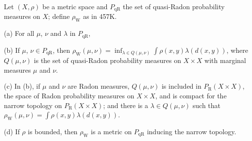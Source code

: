 

 Let $(X,\rho)$ be a metric space and
$P_{\text{qR}}$ the set of
quasi-Radon probability measures on $X$;  define $\rho_{\text{W}}$ as in
457K.

(a) For all $\mu$, $\nu$ and $\lambda$ in $P_{\text{qR}}$,



(b) If $\mu$,
$\nu\in P_{\text{qR}}$, then $\rho_{\text{W}}(\mu,\nu)
=\inf_{\lambda\in Q(\mu,\nu)}\int\rho(x,y)\lambda(d(x,y))$, where
$Q(\mu,\nu)$ is the set of quasi-Radon probability measures on $X\times X$
with marginal measures $\mu$ and $\nu$.

(c) In (b), if $\mu$ and $\nu$ are Radon measures, $Q(\mu,\nu)$ is included
in $P_{\text{R}}(X\times X)$, the space of Radon probability measures on
$X\times X$, and is compact for the narrow topology on
$P_{\text{R}}(X\times X)$;  and there
is a $\lambda\in Q(\mu,\nu)$ such that
$\rho_{\text{W}}(\mu,\nu)=\int\rho(x,y)\lambda(d(x,y))$.

(d) If $\rho$ is bounded, then  $\rho_{\text{W}}$ is a metric on
$P_{\text{qR}}$ inducing
the narrow topology.


